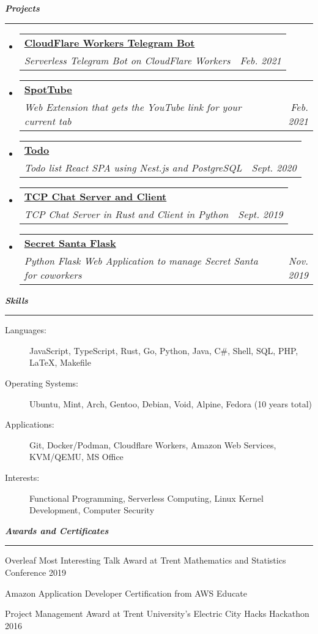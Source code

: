 \documentclass[letterpaper,11pt]{article}
\makeatletter
\newcommand{\mysection}[1]{\vspace{5pt} {\bfseries \textsl{#1}} \\ {\color{gray} \rule[5pt]{\textwidth}{1pt}}}
\newcommand{\ressubheading}[4]{\begin{tabular*}{6.7in}{l@{\extracolsep{\fill}}r}
        \textbf{#1} & #2 \\
        \textit{#3} & \textit{#4} \\
\end{tabular*}\vspace{-6pt}}
\makeatother
\begin{document}
\mysection{Projects}
\begin{itemize}
    \item
        \ressubheading{\href{https://github.com/codebam/cf-workers-telegram-bot}{CloudFlare Workers Telegram Bot}}{}{Serverless Telegram Bot on CloudFlare Workers}{Feb. 2021}
    \item
        \ressubheading{\href{https://github.com/codebam/spottube}{SpotTube}}{}{Web Extension that gets the YouTube link for your current tab}{Feb. 2021}
    \item
        \ressubheading{\href{https://github.com/codebam/todo}{Todo}}{}{Todo list React SPA using Nest.js and PostgreSQL}{Sept. 2020}
    \item
        \ressubheading{\href{https://github.com/codebam/chatserver-rust}{TCP Chat Server and Client}}{}{TCP Chat Server in Rust and Client in Python}{Sept. 2019}
    \item
        \ressubheading{\href{https://github.com/codebam/secret\_santa}{Secret Santa Flask}}{}{Python Flask Web Application to manage Secret Santa for coworkers}{Nov. 2019}
\end{itemize}

\mysection{Skills}
\begin{description}
    \item[Languages:]
        JavaScript, TypeScript, Rust, Go, Python, Java, C\#, Shell, SQL, PHP, \LaTeX{}, Makefile
    \item[Operating Systems:]
        Ubuntu, Mint, Arch, Gentoo, Debian, Void, Alpine, Fedora (10 years total)
    \item[Applications:]
        Git, Docker/Podman, Cloudflare Workers, Amazon Web Services, KVM/QEMU, MS Office
    \item[Interests:]
        Functional Programming, Serverless Computing, Linux Kernel Development, Computer Security
\end{description}

\mysection{Awards and Certificates}
\begin{description}
    \item Overleaf Most Interesting Talk Award at Trent Mathematics and Statistics Conference 2019
    \item Amazon Application Developer Certification from AWS Educate
    \item Project Management Award at Trent University's Electric City Hacks Hackathon 2016
\end{description}
\end{document}
